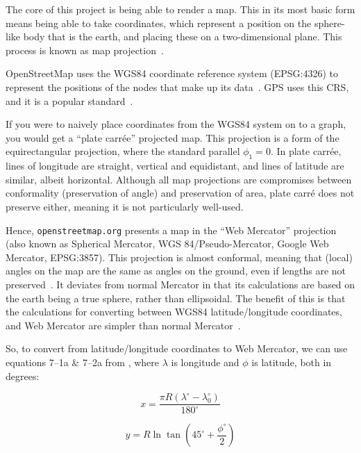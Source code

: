 The core of this project is being able to render a map. This in its most basic form means being able to take coordinates, which represent a position on the sphere-like body that is the earth, and placing these on a two-dimensional plane. This process is known as map projection~\cite[5]{canters2002small}.

OpenStreetMap uses the WGS84 coordinate reference system (EPSG:4326) to represent the positions of the nodes that make up its data~\cite{osm-wiki-wgs84}. GPS uses this CRS, and it is a popular standard~\cite{epsg.io-epsg:4326}.

If you were to naively place coordinates from the WGS84 system on to a graph, you would get a ``plate carrée'' projected map. This projection is a form of the equirectangular projection, where the standard parallel \(\phi_1 = 0\). In plate carrée, lines of longitude are straight, vertical and equidistant, and lines of latitude are similar, albeit horizontal. Although all map projections are compromises between conformality (preservation of angle) and preservation of area, plate carré does not preserve either, meaning it is not particularly well-used.

Hence, \texttt{openstreetmap.org} presents a map in the ``Web Mercator'' projection (also known as Spherical Mercator, WGS 84/Pseudo-Mercator, Google Web Mercator, EPSG:3857). This projection is almost conformal, meaning that (local) angles on the map are the same as angles on the ground, even if lengths are not preserved~\cite{carto-implications-of-webmercator,}. It deviates from normal Mercator in that its calculations are based on the earth being a true sphere, rather than ellipsoidal. The benefit of this is that the calculations for converting between WGS84 latitude/longitude coordinates, and Web Mercator are simpler than normal Mercator~\cite{ugrc-earth-not-round}.

So, to convert from latitude/longitude coordinates to Web Mercator, we can use equations 7--1a \& 7--2a from \textcite[41]{snyder1987map}, where \(\lambda{}\) is longitude and \(\phi{}\) is latitude, both in degrees:

\[x = \frac{\pi R(\lambda^\circ - \lambda^\circ_0)}{180^\circ} \]

\[y = R \ln \tan \left( 45^\circ + \frac{\phi^\circ}{2} \right) \]
